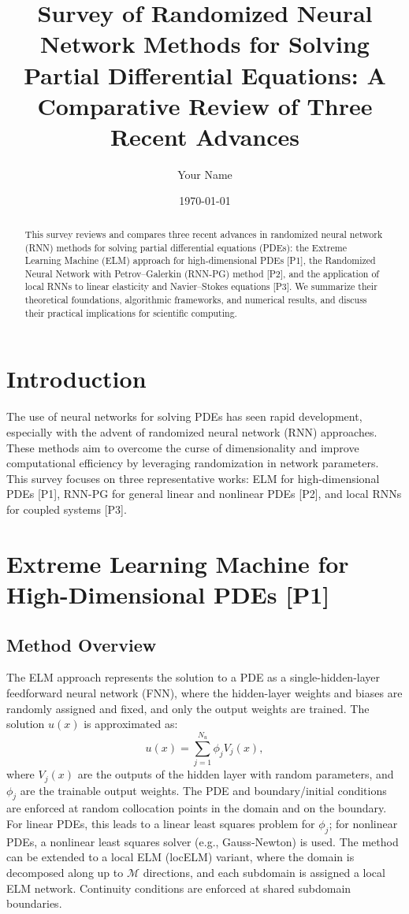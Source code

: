 \documentclass[12pt]{article}
\title{Survey of Randomized Neural Network Methods for Solving Partial Differential Equations: A Comparative Review of Three Recent Advances}
\author{Your Name}
\date{\today}
\begin{document}
\maketitle
\begin{abstract}
This survey reviews and compares three recent advances in randomized neural network (RNN) methods for solving partial differential equations (PDEs): the Extreme Learning Machine (ELM) approach for high-dimensional PDEs [P1], the Randomized Neural Network with Petrov–Galerkin (RNN-PG) method [P2], and the application of local RNNs to linear elasticity and Navier–Stokes equations [P3]. We summarize their theoretical foundations, algorithmic frameworks, and numerical results, and discuss their practical implications for scientific computing.
\end{abstract}

\section{Introduction}
The use of neural networks for solving PDEs has seen rapid development, especially with the advent of randomized neural network (RNN) approaches. These methods aim to overcome the curse of dimensionality and improve computational efficiency by leveraging randomization in network parameters. This survey focuses on three representative works: ELM for high-dimensional PDEs [P1], RNN-PG for general linear and nonlinear PDEs [P2], and local RNNs for coupled systems [P3].

\section{Extreme Learning Machine for High-Dimensional PDEs [P1]}
\subsection{Method Overview}
The ELM approach represents the solution to a PDE as a single-hidden-layer feedforward neural network (FNN), where the hidden-layer weights and biases are randomly assigned and fixed, and only the output weights are trained. The solution $u(x)$ is approximated as:
\begin{equation}
    u(x) = \sum_{j=1}^{N_u} \phi_j V_j(x),
\end{equation}
where $V_j(x)$ are the outputs of the hidden layer with random parameters, and $\phi_j$ are the trainable output weights. The PDE and boundary/initial conditions are enforced at random collocation points in the domain and on the boundary. For linear PDEs, this leads to a linear least squares problem for $\phi_j$; for nonlinear PDEs, a nonlinear least squares solver (e.g., Gauss-Newton) is used. The method can be extended to a local ELM (locELM) variant, where the domain is decomposed along up to $\mathcal{M}$ directions, and each subdomain is assigned a local ELM network. Continuity conditions are enforced at shared subdomain boundaries.
\end{document}
